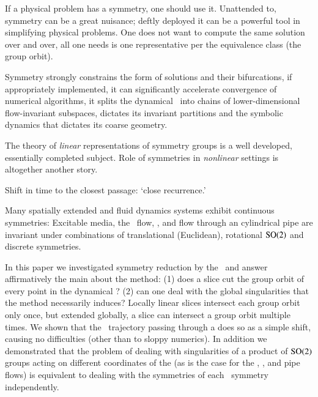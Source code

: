 


If a physical problem has a symmetry, one should use it.
Unattended to, symmetry can be a great nuisance; deftly deployed
it can be a powerful tool in simplifying physical problems.
One does not want to compute the same solution over and over, all
one needs is one representative per the equivalence class (the group orbit).

Symmetry strongly constrains the form of solutions and their bifurcations,
if appropriately implemented, it can significantly accelerate
convergence of numerical algorithms,
it splits the dynamical \statesp\ into chains of lower-dimensional flow-invariant
subspaces, dictates its invariant partitions and the symbolic dynamics that dictates its coarse geometry.

The theory of \emph{linear} representations of symmetry groups is
a well developed, essentially completed subject. Role of symmetries in
\emph{nonlinear} settings is altogether another story.

Shift in time to the closest passage: `close recurrence.'

Many spatially extended and fluid dynamics systems exhibit continuous symmetries:
Excitable media,
the \KS\ flow,
{\pCf}, and flow through an
cylindrical pipe are invariant under
combinations of translational (Euclidean), rotational
$\textrm{SO}(2)$ and discrete symmetries.

In this paper we investigated symmetry reduction by the
\mslices\ and answer affirmatively the main about the method:
(1) does a slice cut the group orbit of every point in the dynamical \statesp?
(2) can one deal with the global singularities that the method necessarily
induces? Locally linear slices intersect each group orbit only once,
but extended globally, a slice can intersect a group orbit multiple times.
We shown that the \reducedsp\ trajectory
passing through a {\sset} does so as a simple shift,
causing no difficulties (other than to sloppy numerics). In addition we
demonstrated that the problem of dealing with singularities of a product
of $\textrm{SO}(2)$ groups acting on different coordinates of the {\statesp}
(as is the case for the \KS{},
{\pCf}, and
pipe flows) is equivalent to dealing with the
symmetries of each \ symmetry independently.



